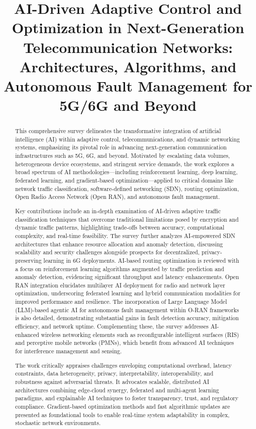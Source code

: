 \documentclass[sigconf]{acmart}
\title{AI-Driven Adaptive Control and Optimization in Next-Generation Telecommunication Networks: Architectures, Algorithms, and Autonomous Fault Management for 5G/6G and Beyond}
\begin{document}
\begin{abstract}
This comprehensive survey delineates the transformative integration of artificial intelligence (AI) within adaptive control, telecommunications, and dynamic networking systems, emphasizing its pivotal role in advancing next-generation communication infrastructures such as 5G, 6G, and beyond. Motivated by escalating data volumes, heterogeneous device ecosystems, and stringent service demands, the work explores a broad spectrum of AI methodologies—including reinforcement learning, deep learning, federated learning, and gradient-based optimization—applied to critical domains like network traffic classification, software-defined networking (SDN), routing optimization, Open Radio Access Network (Open RAN), and autonomous fault management.

Key contributions include an in-depth examination of AI-driven adaptive traffic classification techniques that overcome traditional limitations posed by encryption and dynamic traffic patterns, highlighting trade-offs between accuracy, computational complexity, and real-time feasibility. The survey further analyzes AI-empowered SDN architectures that enhance resource allocation and anomaly detection, discussing scalability and security challenges alongside prospects for decentralized, privacy-preserving learning in 6G deployments. AI-based routing optimization is reviewed with a focus on reinforcement learning algorithms augmented by traffic prediction and anomaly detection, evidencing significant throughput and latency enhancements. Open RAN integration elucidates multilayer AI deployment for radio and network layer optimization, underscoring federated learning and hybrid communication modalities for improved performance and resilience. The incorporation of Large Language Model (LLM)-based agentic AI for autonomous fault management within O-RAN frameworks is also detailed, demonstrating substantial gains in fault detection accuracy, mitigation efficiency, and network uptime. Complementing these, the survey addresses AI-enhanced wireless networking elements such as reconfigurable intelligent surfaces (RIS) and perceptive mobile networks (PMNs), which benefit from advanced AI techniques for interference management and sensing.

The work critically appraises challenges enveloping computational overhead, latency constraints, data heterogeneity, privacy, interpretability, interoperability, and robustness against adversarial threats. It advocates scalable, distributed AI architectures combining edge-cloud synergy, federated and multi-agent learning paradigms, and explainable AI techniques to foster transparency, trust, and regulatory compliance. Gradient-based optimization methods and fast algorithmic updates are presented as foundational tools to enable real-time system adaptability in complex, stochastic network environments.


\end{abstract}
\end{document}
